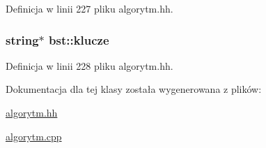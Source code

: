 \-Definicja w linii 227 pliku algorytm.\-hh.

\hypertarget{classbst_a7e0cb2caf584c2de1d5ba767731c9c3a}{
\subsubsection[{klucze}]{\setlength{\rightskip}{0pt plus 5cm}string$\ast$ {\bf bst\-::klucze}}}\label{classbst_a7e0cb2caf584c2de1d5ba767731c9c3a}


\-Definicja w linii 228 pliku algorytm.\-hh.



\-Dokumentacja dla tej klasy została wygenerowana z plików\-:\begin{DoxyCompactItemize}
\item 
\hyperlink{algorytm_8hh}{algorytm.\-hh}\item 
\hyperlink{algorytm_8cpp}{algorytm.\-cpp}\end{DoxyCompactItemize}
